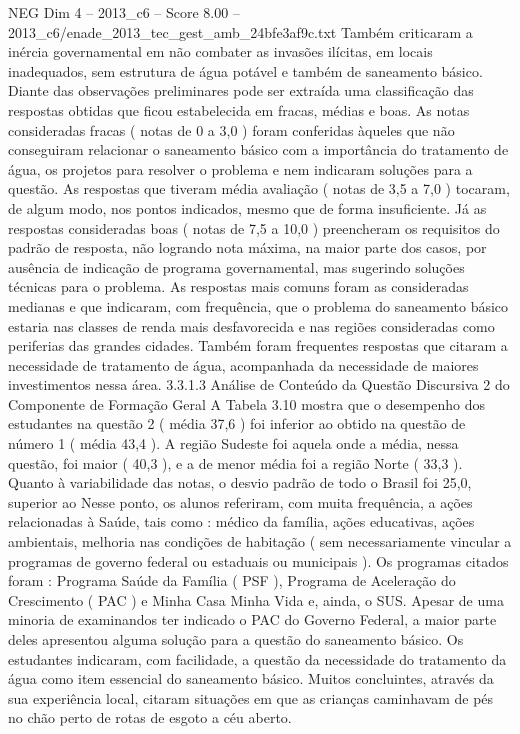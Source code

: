 \begin{textsample}{NEG Dim 4 – 2013\_c6 – Score 8.00 – 2013\_c6/enade\_2013\_tec\_gest\_amb\_24bfe3af9c.txt}
Também criticaram a inércia governamental em não combater as invasões ilícitas, em locais inadequados, sem estrutura de água potável e também de saneamento básico.
Diante das observações preliminares pode ser extraída uma classificação das respostas obtidas que ficou estabelecida em fracas, médias e boas.
As notas consideradas fracas ( notas de 0 a 3,0 ) foram conferidas àqueles que não conseguiram relacionar o saneamento básico com a importância do tratamento de água, os projetos para resolver o problema e nem indicaram soluções para a questão.
As respostas que tiveram média avaliação ( notas de 3,5 a 7,0 ) tocaram, de algum modo, nos pontos indicados, mesmo que de forma insuficiente.
Já as respostas consideradas boas ( notas de 7,5 a 10,0 ) preencheram os requisitos do padrão de resposta, não logrando nota máxima, na maior parte dos casos, por ausência de indicação de programa governamental, mas sugerindo soluções técnicas para o problema.
As respostas mais comuns foram as consideradas medianas e que indicaram, com frequência, que o problema do saneamento básico estaria nas classes de renda mais desfavorecida e nas regiões consideradas como periferias das grandes cidades.
Também foram frequentes respostas que citaram a necessidade de tratamento de água, acompanhada da necessidade de maiores investimentos nessa área. 3.3.1.3 Análise de Conteúdo da Questão Discursiva 2 do Componente de Formação Geral A Tabela 3.10 mostra que o desempenho dos estudantes na questão 2 ( média 37,6 ) foi inferior ao obtido na questão de número 1 ( média 43,4 ).
A região Sudeste foi aquela onde a média, nessa questão, foi maior ( 40,3 ), e a de menor média foi a região Norte ( 33,3 ).
Quanto à variabilidade das notas, o desvio padrão de todo o Brasil foi 25,0, superior ao Nesse ponto, os alunos referiram, com muita frequência, a ações relacionadas à Saúde, tais como : médico da família, ações educativas, ações ambientais, melhoria nas condições de habitação ( sem necessariamente vincular a programas de governo federal ou estaduais ou municipais ).
Os programas citados foram : Programa Saúde da Família ( PSF ), Programa de Aceleração do Crescimento ( PAC ) e Minha Casa Minha Vida e, ainda, o SUS.
Apesar de uma minoria de examinandos ter indicado o PAC do Governo Federal, a maior parte deles apresentou alguma solução para a questão do saneamento básico.
Os estudantes indicaram, com facilidade, a questão da necessidade do tratamento da água como item essencial do saneamento básico.
Muitos concluintes, através da sua experiência local, citaram situações em que as crianças caminhavam de pés no chão perto de rotas de esgoto a céu aberto.

\end{textsample}
